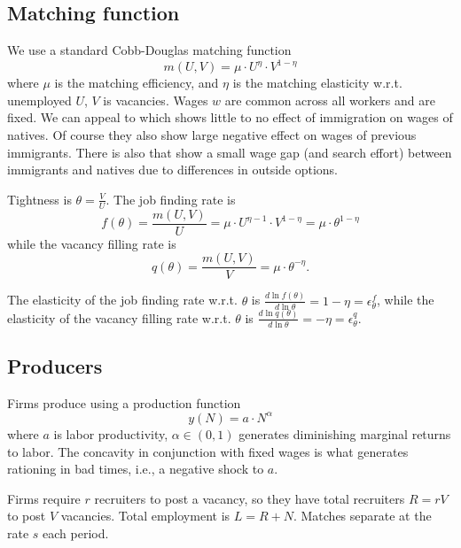 \documentclass[12pt]{article}
\begin{document}
\subsection{Matching function}
We use a standard Cobb-Douglas matching function
\begin{equation}
    m(U,V) = \mu \cdot U^\eta \cdot V^{1-\eta}
\end{equation}
where $\mu$ is the matching efficiency, and $\eta$ is the matching elasticity w.r.t. unemployed $U$, $V$ is vacancies.
Wages $w$ are common across all workers and are fixed. We can appeal to \textcite{ottaviano_peri_JEEA_2012_immigration_no_effect_on_wages} which shows little to no effect of immigration on wages of natives.
Of course they also show large negative effect on wages of previous immigrants.
There is also \textcite{albert_AEJMacro_2021_immigration_job_creation_vs_competition} that show a small wage gap (and search effort) between immigrants and natives due to differences in outside options.

Tightness is $\theta = \frac{V}{U}$. The job finding rate is
\begin{equation}
    f(\theta) = \frac{m(U,V)}{U} = \mu \cdot U^{\eta - 1} \cdot V^{1-\eta} = \mu \cdot \theta^{1-\eta}
\end{equation}
while the vacancy filling rate is
\begin{equation}
    q(\theta) = \frac{m(U,V)}{V} = \mu \cdot \theta^{-\eta}.
\end{equation}

The elasticity of the job finding rate w.r.t. $\theta$ is $\frac{d \ln f(\theta)}{d \ln \theta} = 1 - \eta = \epsilon^f_\theta$, while the elasticity of the vacancy filling rate w.r.t. $\theta$ is $\frac{d \ln q(\theta)}{d \ln \theta} = - \eta = \epsilon^q_\theta$.

\subsection{Producers}
Firms produce using a production function
\begin{equation}
    y(N) = a \cdot N^\alpha
\end{equation}
where $a$ is labor productivity, $\alpha \in (0, 1)$ generates diminishing marginal returns to labor. The concavity in conjunction with fixed wages is what generates rationing in bad times, i.e., a negative shock to $a$.

Firms require $r$ recruiters to post a vacancy, so they have total recruiters $R=rV$ to post $V$ vacancies.
Total employment is $L = R + N$.
Matches separate at the rate $s$ each period.
\end{document}
